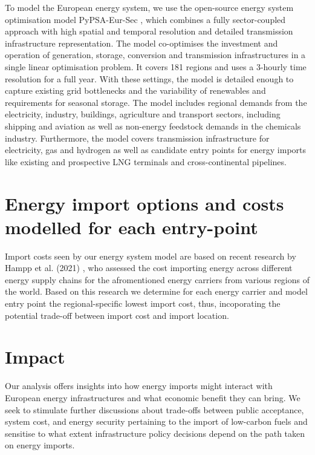 \documentclass[12pt,3p]{elsarticle}
\begin{document}
To model the European energy system, we use the open-source energy system
optimisation model PyPSA-Eur-Sec \cite{PyPSAEurSecSectorCoupled}, which combines a fully
sector-coupled approach with high spatial and temporal resolution and detailed
transmission infrastructure representation. The model co-optimises the
investment and operation of generation, storage, conversion and transmission
infrastructures in a single linear optimisation problem. It covers 181 regions
and uses a 3-hourly time resolution for a full year. With these settings, the
model is detailed enough to capture existing grid bottlenecks and the
variability of renewables and requirements for seasonal storage. The model
includes regional demands from the electricity, industry, buildings, agriculture
and transport sectors, including shipping and aviation as well as non-energy
feedstock demands in the chemicals industry.  Furthermore, the model covers
transmission infrastructure for electricity, gas and hydrogen as well as
candidate entry points for energy imports like existing and prospective LNG
terminals and cross-continental pipelines.

\section*{Energy import options and costs modelled for each entry-point}

Import costs seen by our energy system model are based on recent research by
Hampp et al. (2021) \cite{hamppImportOptions2023}, who assessed the cost
importing energy across different energy supply chains for the afromentioned
energy carriers from various regions of the world. Based on this research we
determine for each energy carrier and model entry point the regional-specific
lowest import cost, thus, incoporating the potential trade-off between import
cost and import location.

\section*{Impact}

Our analysis offers insights into how energy imports might interact with
European energy infrastructures and what economic benefit they can bring. We
seek to stimulate further discussions about trade-offs between public
acceptance, system cost, and energy security pertaining to the import of
low-carbon fuels and sensitise to what extent infrastructure policy decisions
depend on the path taken on energy imports.
\end{document}
